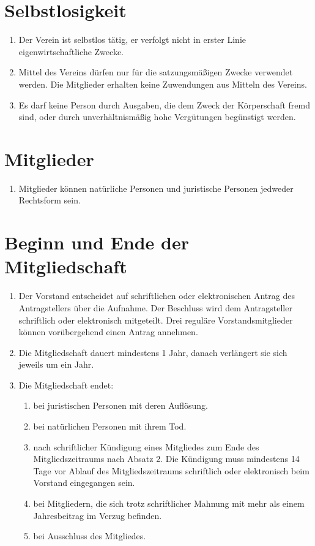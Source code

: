 \documentclass[ngerman]{article}
\begin{document}
\section{Selbstlosigkeit}
\begin{enumerate}
\item Der Verein ist selbstlos tätig, er verfolgt nicht in erster Linie eigenwirtschaftliche Zwecke.
\item Mittel des Vereins dürfen nur für die satzungsmäßigen Zwecke verwendet werden. Die Mitglieder erhalten keine Zuwendungen aus Mitteln des
Vereins.
\item Es darf keine Person durch Ausgaben, die dem Zweck der Körperschaft fremd sind, oder durch unverhältnismäßig hohe Vergütungen begünstigt
werden.
\end{enumerate}

\section{Mitglieder}
\begin{enumerate}
\item Mitglieder können natürliche Personen und juristische Personen jedweder Rechtsform sein.
\end{enumerate}

\section{Beginn und Ende der Mitgliedschaft}
\begin{enumerate}
\item Der Vorstand entscheidet auf schriftlichen oder elektronischen Antrag des Antragstellers über die Aufnahme. Der Beschluss wird dem Antragsteller schriftlich oder elektronisch mitgeteilt. Drei reguläre Vorstandsmitglieder können vorübergehend einen Antrag annehmen.
\item Die Mitgliedschaft dauert mindestens 1 Jahr, danach verlängert sie sich jeweils um ein Jahr.
\item Die Mitgliedschaft endet:

\begin{enumerate}
\item bei juristischen Personen mit deren Auflösung.
\item bei natürlichen Personen mit ihrem Tod.
\item nach schriftlicher Kündigung eines Mitgliedes zum Ende des Mitgliedszeitraums nach Absatz 2. Die Kündigung muss mindestens 14 Tage vor Ablauf des Mitgliedszeitraums schriftlich oder elektronisch beim Vorstand eingegangen sein.
\item bei Mitgliedern, die sich trotz schriftlicher Mahnung mit mehr als einem Jahresbeitrag im Verzug befinden.
\item bei Ausschluss des Mitgliedes.
\end{enumerate}
\end{enumerate}
\end{document}
